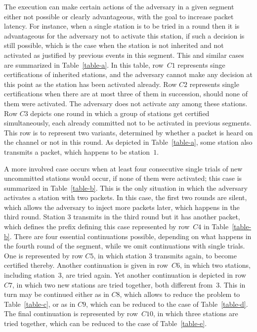 \documentclass[11pt]{article}
\begin{document}
The execution can make certain actions of the adversary in a given segment either not possible or clearly advantageous, with the goal to increase packet latency.
For instance, when a single station is to be tried in a round then it is advantageous for the adversary not to activate this station, if such a decision is still possible, which is the case when the station is not inherited and not activated as justified by previous events in this segment.
This and similar cases are summarized in Table~\ref{table-a}.
In this table, row~$C1$ represents singe certifications of inherited stations, and the adversary cannot make any decision at this point as the station has been activated already. 
Row $C2$ represents single certifications when there are at most three of them in succession, should none of them were activated.
The adversary does not activate any among these stations.
Row $C3$ depicts one round in which a group of stations get certified simultaneously, each already committed not to be activated in previous segments.
This row is to represent two variants, determined by whether a packet is heard on the channel or not in this round.
As depicted in Table~\ref{table-a}, some station also transmits a packet, which happens to be station~$1$.

A more involved case occurs when at least four consecutive single trials of new uncommitted stations would occur, if none of them were activated; this case is summarized in Table~\ref{table-b}.
This is the only situation in which the adversary activates a station with two packets.
In this case, the first two rounds are silent, which allows the adversary to inject more packets later, which happens in the third round.
Station $3$ transmits in the third round but it has another packet, which defines the prefix defining this case represented by row~$C4$ in Table~\ref{table-b}.
There are four essential continuations possible, depending on what happens in the fourth round of the segment, while we omit continuations with single trials.
One is represented by row $C5$, in which station $3$ transmits again, to become certified thereby.
Another continuation is given in row~$C6$, in which two stations, including station~$3$, are tried again.
Yet another continuation is depicted in row~$C7$, in which two new stations are tried together, both different from~$3$.
This in turn may be continued either as in $C8$, which allows to reduce the problem to Table~\ref{table-c},  or as in $C9$, which can be reduced to the case of Table~\ref{table-d}.
The final continuation is represented by row~$C10$, in which three stations are tried together, which can be reduced to the case of Table~\ref{table-e}.
\end{document}

